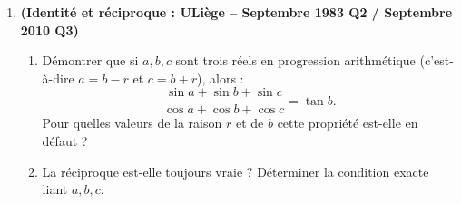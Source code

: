 \begin{enumerate}[label=\textbf{Exercice 2.\arabic* --}, align=left, leftmargin=*]
    \item \textbf{(Identité et réciproque : ULiège -- Septembre 1983 Q2 / Septembre 2010 Q3)}
    \begin{enumerate}
        \item Démontrer que si $a, b, c$ sont trois réels en progression arithmétique (c'est-à-dire $a = b-r$ et $c = b+r$), alors :
        \[
            \frac{\sin a + \sin b + \sin c}{\cos a + \cos b + \cos c} = \tan b.
        \]
        Pour quelles valeurs de la raison $r$ et de $b$ cette propriété est-elle en défaut ?
        \item La réciproque est-elle toujours vraie ? Déterminer la condition exacte liant $a, b, c$.
    \end{enumerate}
\end{enumerate}
